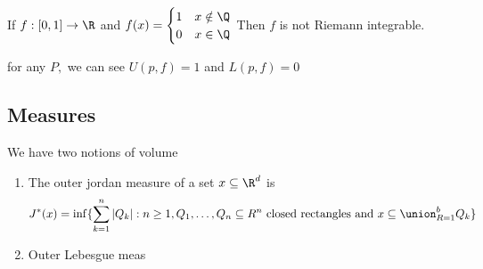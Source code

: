 \begin{example}
	If $f:[0,1] \to \R$ and $f(x) = 
	\begin{cases}
		1 & x\notin \Q \\
		0 & x\in \Q
	\end{cases} $
	Then $f$ is not Riemann integrable. \\
	\begin{solution}
		for any $P,$ we can see  $U(p,f) = 1$ and  $L(p,f) = 0$
	\end{solution}
\end{example}

\subsection{Measures}

We have two notions of volume
\begin{enumerate}
	\item The outer jordan measure of a set $x \subseteq \R^d$ is
		\begin{align*}
			J^* (x) 
			= \inf\{ \sum_{k=1}^{n} |Q_k| : n \geq 1, Q_1, \ldots, Q_n \subseteq R^n  \text{ closed rectangles and }
			x \subseteq \union_{R=1}^{b} Q_k \}
		\end{align*}
	\item Outer Lebesgue meas
\end{enumerate}

